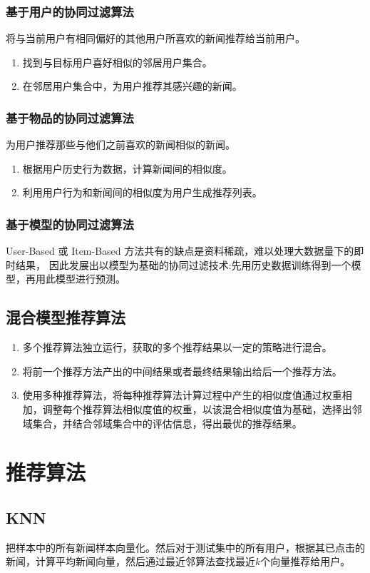 \documentclass[UTF8]{article}
\begin{document}
\subsubsection{基于用户的协同过滤算法}
将与当前用户有相同偏好的其他用户所喜欢的新闻推荐给当前用户。
	\begin{enumerate}
        \item 找到与目标用户喜好相似的邻居用户集合。
        \item 在邻居用户集合中，为用户推荐其感兴趣的新闻。
    \end{enumerate}
\subsubsection{基于物品的协同过滤算法}
为用户推荐那些与他们之前喜欢的新闻相似的新闻。
	\begin{enumerate}
        \item 根据用户历史行为数据，计算新闻间的相似度。
        \item 利用用户行为和新闻间的相似度为用户生成推荐列表。
    \end{enumerate}
\subsubsection{基于模型的协同过滤算法}
User-Based 或 Item-Based 方法共有的缺点是资料稀疏，难以处理大数据量下的即时结果，
因此发展出以模型为基础的协同过滤技术:先用历史数据训练得到一个模型，再用此模型进行预测。
\subsection{混合模型推荐算法}
	\begin{enumerate}
        \item 多个推荐算法独立运行，获取的多个推荐结果以一定的策略进行混合。
        \item 将前一个推荐方法产出的中间结果或者最终结果输出给后一个推荐方法。
        \item 使用多种推荐算法，将每种推荐算法计算过程中产生的相似度值通过权重相加，调整每个推荐算法相似度值的权重，以该混合相似度值为基础，选择出邻域集合，并结合邻域集合中的评估信息，得出最优的推荐结果。
    \end{enumerate}

\section{推荐算法}
\subsection{KNN}
把样本中的所有新闻样本向量化。然后对于测试集中的所有用户，根据其已点击的新闻，计算平均新闻向量，然后通过最近邻算法查找最近$k$个向量推荐给用户。
\end{document}
